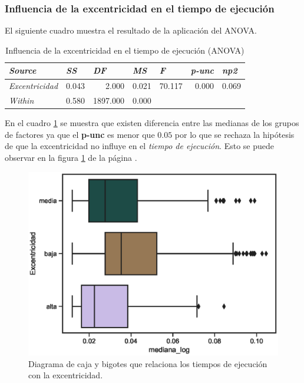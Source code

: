 \documentclass{article}
\begin{document}
\subsubsection{Influencia de la excentricidad en el tiempo de ejecución}
El siguiente cuadro muestra el resultado de la aplicación del ANOVA.

\begin{table}[htbp]
  \centering
  \caption{Influencia de la excentricidad en el tiempo de ejecución (ANOVA)}
    \begin{tabular}{lrrrrrr}
    \toprule
    \textit{\textbf{Source}} & \multicolumn{1}{l}{\textit{\textbf{SS}}} & \multicolumn{1}{l}{\textit{\textbf{DF}}} & \multicolumn{1}{l}{\textit{\textbf{MS}}} & \multicolumn{1}{l}{\textit{\textbf{F}}} & \multicolumn{1}{l}{\textit{\textbf{p-unc}}} & \multicolumn{1}{l}{\textit{\textbf{np2}}} \\
    \midrule
    \textit{Excentricidad} & 0.043 & 2.000 & 0.021 & 70.117 & 0.000 & 0.069 \\
    \textit{Within} & 0.580 & 1897.000 & 0.000 &       &       &  \\
    \bottomrule
    \end{tabular}%
  \label{tab:t10}%
\end{table}%

En el cuadro \ref{tab:t10} se muestra que existen diferencia entre las medianas de los grupos de factores ya que el {\bf p-unc} es menor que $0.05$ por lo que se rechaza la hipótesis de que la excentricidad no influye en el \textit{tiempo de ejecución}. Esto se puede observar en la figura \ref{fig17} de la página \pageref{fig17}.

\begin{center}
\begin{figure}[htbp]
\includegraphics[scale=0.6]{boxplot_Excentricidad.eps}
\caption{Diagrama de caja y bigotes que relaciona los tiempos de ejecución con la excentricidad.}
\label{fig17}
\end{figure}
\end{center}
\end{document}
